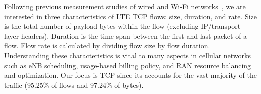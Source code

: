 
Following previous measurement studies of wired and Wi-Fi networks~\cite{trat, qian09, chen12}, we are interested in three characteristics of LTE TCP flows: size, duration, and rate. Size is the total number of payload bytes
within the flow (excluding IP/transport layer headers). Duration is the time span between the
first and last packet of a flow. Flow rate is calculated by dividing
flow size by flow duration. Understanding these characteristics is vital to many aspects in cellular networks such as eNB scheduling, usage-based billing policy, and RAN resource balancing and optimization. Our focus is TCP since its accounts for the vast majority of the traffic (95.25\% of flows and 97.24\% of bytes).


\begin{figure}[t]
\centering
{}\\
\label{fig:flow.payload}
\end{figure}

